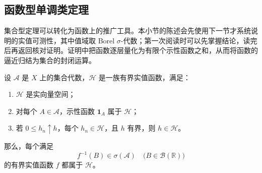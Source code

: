 \subsection{函数型单调类定理}
\label{b1:subsec:010305}

集合型定理可以转化为函数上的推广工具。本小节的陈述会先使用下一节才系统说明的实值可测性，其中值域取 Borel \(\sigma\)-代数；第一次阅读时可以先掌握结论，读完后再返回核对证明。证明中把函数逐层量化为有限个示性函数之和，从而将函数的逼近归结为集合的封闭运算。

\begin{theorem}[函数型单调类]
\label{b1:thm:functional-monotone-class}
设 \(\mathcal A\) 是 \(X\) 上的集合代数，\(\mathcal H\) 是一族有界实值函数，满足：
\begin{enumerate}
  \item \label{b1:item:functional-monotone-1}
  \(\mathcal H\) 是实向量空间；
  \item \label{b1:item:functional-monotone-2}
  对每个 \(A\in\mathcal A\)，示性函数 \(\mathbf 1_A\) 属于 \(\mathcal H\)；
  \item \label{b1:item:functional-monotone-3}
  若 \(0\leq h_n\uparrow h\)，每个 \(h_n\in\mathcal H\)，且 \(h\) 有界，则 \(h\in\mathcal H\)。
\end{enumerate}
那么，每个满足
\[
f^{-1}(B)\in\sigma(\mathcal A)
\quad\bigl(B\in\mathcal B(\mathbb R)\bigr)
\]
的有界实值函数 \(f\) 都属于 \(\mathcal H\)。
\end{theorem}
